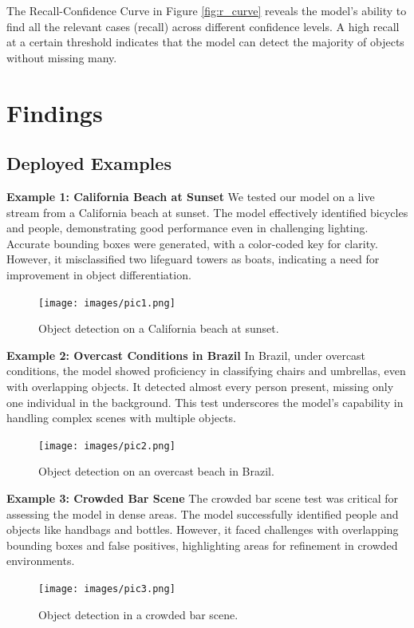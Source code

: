 \documentclass[10pt]{extarticle}
\begin{document}
The Recall-Confidence Curve in Figure \ref{fig:r_curve} reveals the model's ability to find all the relevant cases (recall) across different confidence levels. A high recall at a certain threshold indicates that the model can detect the majority of objects without missing many.

\section{Findings}

\subsection{Deployed Examples}

\textbf{Example 1: California Beach at Sunset}
We tested our model on a live stream from a California beach at sunset. The model effectively identified bicycles and people, demonstrating good performance even in challenging lighting. Accurate bounding boxes were generated, with a color-coded key for clarity. However, it misclassified two lifeguard towers as boats, indicating a need for improvement in object differentiation.

\begin{figure}[H]
\centering
\texttt{[image: images/pic1.png]}
\caption{Object detection on a California beach at sunset.}
\end{figure}

\textbf{Example 2: Overcast Conditions in Brazil}
In Brazil, under overcast conditions, the model showed proficiency in classifying chairs and umbrellas, even with overlapping objects. It detected almost every person present, missing only one individual in the background. This test underscores the model's capability in handling complex scenes with multiple objects.

\begin{figure}[H]
\centering
\texttt{[image: images/pic2.png]}
\caption{Object detection on an overcast beach in Brazil.}
\end{figure}

\textbf{Example 3: Crowded Bar Scene}
The crowded bar scene test was critical for assessing the model in dense areas. The model successfully identified people and objects like handbags and bottles. However, it faced challenges with overlapping bounding boxes and false positives, highlighting areas for refinement in crowded environments.

\begin{figure}[H]
\centering
\texttt{[image: images/pic3.png]}
\caption{Object detection in a crowded bar scene.}
\end{figure}
\end{document}
